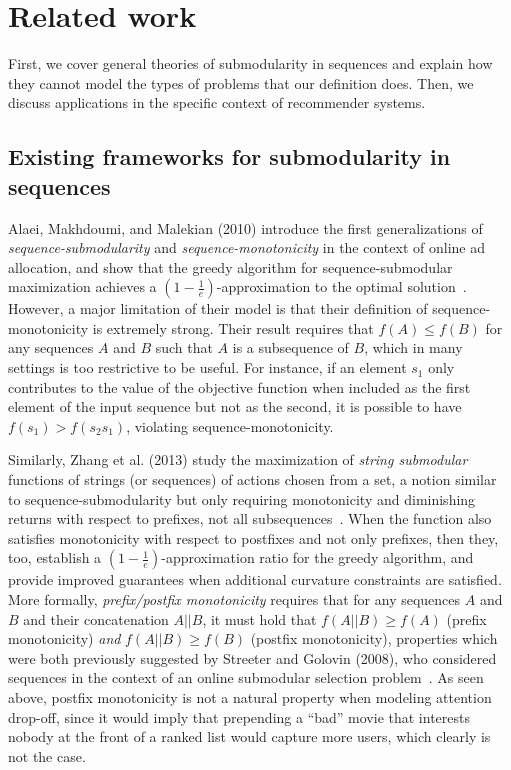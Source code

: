 
% 

\section{Related work} \label{sec:relatedwork}

First, we cover general theories of submodularity in sequences and explain how they cannot model the types of problems that our definition does. Then, we discuss applications in the specific context of recommender systems.

\subsection{Existing frameworks for submodularity in sequences} 
Alaei, Makhdoumi, and Malekian (2010) introduce the first generalizations of \emph{sequence-submodularity} and \emph{sequence-monotonicity} in the context of online ad allocation, and show that the greedy algorithm for sequence-submodular maximization achieves a $(1-\frac{1}{e})$-approximation to the optimal solution~\cite{Alaei19}. However, a major limitation of their model is that their definition of sequence-monotonicity is extremely strong. Their result requires that $f(A) \le f(B)$ for any sequences $A$ and $B$ such that $A$ is a subsequence of $B$, which in many settings is too restrictive to be useful. For instance, if an element $s_1$ only contributes to the value of the objective function when included as the first element of the input sequence but not as the second, it is possible to have $f(s_1) > f(s_2 s_1)$, violating sequence-monotonicity.

Similarly, Zhang et al. (2013) study the maximization of \emph{string submodular} functions of strings (or sequences) of actions chosen from a set, a notion similar to sequence-submodularity but only requiring monotonicity and diminishing returns with respect to prefixes, not all subsequences~\cite{Zhang16}. When the function also satisfies monotonicity with respect to postfixes and not only prefixes, then they, too, establish a $(1-\frac{1}{e})$-approximation ratio for the greedy algorithm, and provide improved guarantees when additional curvature constraints are satisfied. More formally, \emph{prefix/postfix monotonicity} requires that for any sequences $A$ and $B$ and their concatenation $A||B$, it must hold that $f(A||B)\ge f(A)$ (prefix monotonicity) \emph{and} $f(A||B) \ge f(B)$ (postfix monotonicity), properties which were both previously suggested by Streeter and Golovin (2008), who considered sequences in the context of an online submodular selection problem~\cite{StreeterGolovin}. As seen above, postfix monotonicity is not a natural property when modeling attention drop-off, since it would imply that prepending a ``bad'' movie that interests nobody at the front of a ranked list would capture more users, which clearly is not the case.

